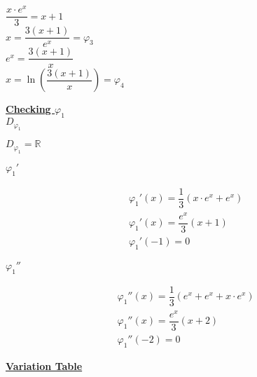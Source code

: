 \newpage
\begin{center}
\(\dfrac{x\cdot e^{x}}{3} = x+1\)\\[0.2cm]
\(\boxed{x = \dfrac{3(x+1)}{e^{x}} = \varphi_3}\)\\[0.5cm]
\(e^{x} = \dfrac{3(x+1)}{x}\)\\[0.2cm]
\(\boxed{x = \ln{\left(\dfrac{3(x+1)}{x}\right)} = \varphi_4}\)\\[0.2cm]
\end{center}

\vspace{1cm}
\textbf{\underline{Checking \(\varphi_1\)}}\\[0.15cm]
\textbf{\underline{\(D_{\varphi_1}\)}}
\begin{center}
    \( \boxed{D_{\varphi_1} = \mathbb{R}}\)
\end{center}
\textbf{\underline{\(\varphi_1'\)}}
\begin{center}
    \begin{align*}
        &\varphi_1'(x) = \dfrac{1}{3} (x\cdot e^{x} + e^{x})\\[0.15cm]
        &\boxed{\varphi_1'(x) = \dfrac{e^{x}}{3} (x + 1)}\\[0.15cm]
        &\boxed{\varphi_1'(-1) = 0}
    \end{align*}
\end{center}

\vspace{0.5cm}
\textbf{\underline{\(\varphi_1''\)}}
\begin{center}
    \begin{align*}
        &\varphi_1''(x) = \dfrac{1}{3} (e^{x}+e^{x}+x\cdot e^{x})\\[0.15cm]
        &\boxed{\varphi_1''(x) = \dfrac{e^{x}}{3} (x + 2)}\\[0.15cm]
        &\boxed{\varphi_1''(-2) = 0}
    \end{align*}
\end{center}

\newpage
\textbf{\underline{Variation Table}}

\begin{center}
\end{center}
\vspace{0.25cm}

